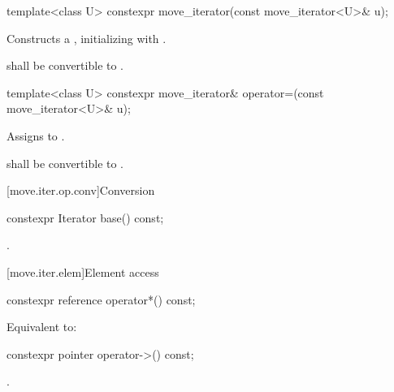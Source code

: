 %
\begin{itemdecl}
template<class U> constexpr move_iterator(const move_iterator<U>& u);
\end{itemdecl}

\begin{itemdescr}
\pnum
\effects Constructs a , initializing
 with .

\pnum
\requires {} shall be convertible to
.
\end{itemdescr}

%
\begin{itemdecl}
template<class U> constexpr move_iterator& operator=(const move_iterator<U>& u);
\end{itemdecl}

\begin{itemdescr}
\pnum
\effects Assigns  to
.

\pnum
\requires {} shall be convertible to
.
\end{itemdescr}

[move.iter.op.conv]{Conversion}

%
\begin{itemdecl}
constexpr Iterator base() const;
\end{itemdecl}

\begin{itemdescr}
\pnum
\returns {}.
\end{itemdescr}

[move.iter.elem]{Element access}

%
\begin{itemdecl}
constexpr reference operator*() const;
\end{itemdecl}

\begin{itemdescr}
\pnum
\effects Equivalent to: 
\end{itemdescr}

%
\begin{itemdecl}
constexpr pointer operator->() const;
\end{itemdecl}

\begin{itemdescr}
\pnum
\returns {}.
\end{itemdescr}

